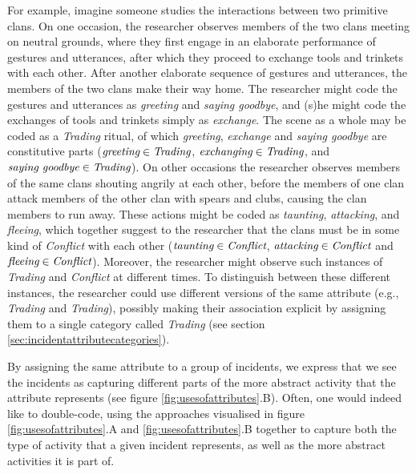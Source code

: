\documentclass{memoir}
\begin{document}
For example, imagine someone studies the interactions between two primitive clans. On one occasion, the researcher observes members of the two clans meeting on neutral grounds, where they first engage in  an elaborate performance of gestures and utterances, after which they proceed to exchange tools and trinkets with each other. After another elaborate sequence of gestures and utterances, the members of the two clans make their way home. The researcher might code the gestures and utterances as \emph{greeting} and \emph{saying goodbye}, and (s)he might code the exchanges of tools and trinkets simply as \emph{exchange}. The scene as a whole may be coded as a \emph{Trading} ritual, of which \emph{greeting}, \emph{exchange} and \emph{saying goodbye} are constitutive parts (\(\emph{greeting} \in \emph{Trading}\), \(\emph{exchanging} \in \emph{Trading}\), and \(\emph{saying goodbye} \in \emph{Trading}\)). On other occasions the researcher observes members of the same clans shouting angrily at each other, before the members of one clan attack members of the other clan with spears and clubs, causing the clan members to run away. These actions might be coded as \emph{taunting}, \emph{attacking}, and \emph{fleeing}, which together suggest to the researcher that the clans must be in some kind of \emph{Conflict} with each other (\(\emph{taunting} \in \emph{Conflict}\), \(\emph{attacking} \in \emph{Conflict}\) and \(\emph{fleeing} \in \emph{Conflict}\)). Moreover, the researcher might observe such instances of \emph{Trading} and \emph{Conflict} at different times. To distinguish between these different instances, the researcher could use different versions of the same attribute (e.g., \emph{Trading} and \emph{Trading}), possibly making their association explicit by assigning them to a single category called \emph{Trading} (see section \ref{sec:incidentattributecategories}).

By assigning the same attribute to a group of incidents, we express that we see the incidents as capturing different parts of the more abstract activity that the attribute represents (see figure \ref{fig:usesofattributes}.B). Often, one would indeed like to double-code, using the approaches visualised in figure \ref{fig:usesofattributes}.A and \ref{fig:usesofattributes}.B together to capture both the type of activity that a given incident represents, as well as the more abstract activities it is part of. 
   
\end{document}

